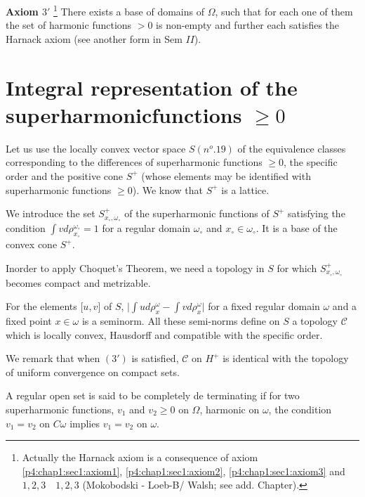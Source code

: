 \medskip
\noindent \textbf{Axiom $3'$} 
  \footnote{Actually the Harnack  axiom is a consequence of axiom
    \ref{p4:chap1:sec1:axiom1}, \ref{p4:chap1:sec1:axiom2},
    \ref{p4:chap1:sec1:axiom3}
    and $1, 2,3 \quad 1, 2, 3$ (Mokobodski - Loeb-B/ Walsh; see
    add. Chapter).} There exists a base of domains of $\Omega$, such
  that for each one of them the set of harmonic functions $> 0$ is
  non-empty and further each satisfies the Harnack axiom (see another
  form in Sem $II$). 

\section[Integral representation of...]{Integral representation of the superharmonic\break functions $\ge
  0$}\label{p4:chap10:sec42}%

Let us use the locally convex vector space $S (n^o. 19)$ of the
equivalence classes corresponding to the differences of superharmonic
functions $\ge 0$, the specific order and the positive cone $S^+$
(whose elements may be identified with superharmonic functions $\ge
0$). We know that $S^+$ is a lattice. 

We introduce the set $S^+_{x_\circ, \omega_\circ}$ of the superharmonic
functions of $S^+$ satisfying the condition $\int v d
\rho^{\omega_\circ}_{x_\circ} = 1$ for a regular domain $\omega_\circ$ and $x_\circ
\in \omega_\circ$. It is a base of the convex cone $S^+$. 

In\pageoriginale order to apply Choquet's Theorem, we need a topology in $S$ for
which $S^+_{x_\circ, \omega_\circ}$ becomes compact and metrizable. 

\begin{prop}\label{p4:chap10:sec42:prop27} %
  For the elements [$u, v$] of $S$, $\big | \int u d \rho^\omega_x -
  \int v d \rho^\omega_x \big |$ for a fixed regular domain $\omega$
  and a fixed point $x \in \omega$ is a seminorm. All these semi-norms
  define on $S$ a topology $\mathscr{C}$ which is locally convex,
  Hausdorff and compatible with the specific order. 
\end{prop}
 
We remark that when $(3')$ is satisfied, $\mathscr{C}$ on $H^+$ is
identical with the topology of uniform convergence on compact sets.  
 
\begin{defi*} %
  A regular open set is said to be completely de terminating if for two
  superharmonic functions, $v_1 $ and $v_2 \ge 0$ on $\Omega$,
  harmonic on $\omega$, the condition $v_1 =  v_2$ on $C \omega$
  implies $v_1 = v_2$ on $\omega$. 
\end{defi*} 
 
